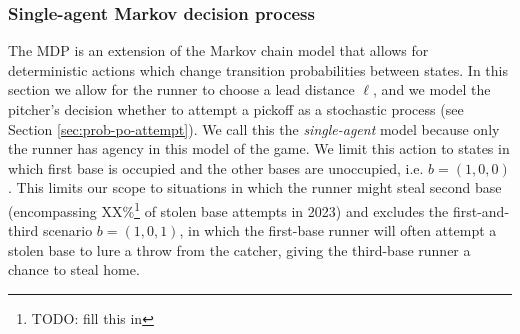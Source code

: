 \documentclass{article}
\begin{document}
 
      \subsubsection{Single-agent Markov decision process}
      \label{sec:single-agent-mdp}

        The MDP is an extension of the Markov chain model that allows for deterministic actions which change transition probabilities between states. In this section we allow for the runner to choose a lead distance $\ell$, and we model the pitcher's decision whether to attempt a pickoff as a stochastic process (see Section \ref{sec:prob-po-attempt}). We call this the {\it single-agent} model because only the runner has agency in this model of the game. We limit this action to states in which first base is occupied and the other bases are unoccupied, i.e. $b = (1, 0, 0)$. This limits our scope to situations in which the runner might steal second base (encompassing XX\%\footnote{TODO: fill this in} of stolen base attempts in 2023) and excludes the first-and-third scenario $b = (1, 0, 1)$, in which the first-base runner will often attempt a stolen base to lure a throw from the catcher, giving the third-base runner a chance to steal home.
     
\end{document}
